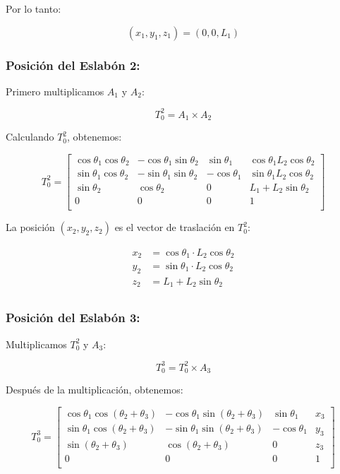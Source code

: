 \documentclass[10pt]{article}
\theoremstyle{definition}
\theoremstyle{remark}
\theoremstyle{definition}
\numberwithin{equation}{prob}
\begin{document}
Por lo tanto:

\[
(x_1, y_1, z_1) = (0, 0, L_1)
\]

\subsubsection{Posición del Eslabón 2:}

Primero multiplicamos \( A_1 \) y \( A_2 \):

\[
T_0^2 = A_1 \times A_2
\]

Calculando \( T_0^2 \), obtenemos:

\[
T_0^2 = \begin{bmatrix}
\cos\theta_1 \cos\theta_2 & -\cos\theta_1 \sin\theta_2 & \sin\theta_1 & \cos\theta_1 L_2 \cos\theta_2 \\
\sin\theta_1 \cos\theta_2 & -\sin\theta_1 \sin\theta_2 & -\cos\theta_1 & \sin\theta_1 L_2 \cos\theta_2 \\
\sin\theta_2 & \cos\theta_2 & 0 & L_1 + L_2 \sin\theta_2 \\
0 & 0 & 0 & 1 \\
\end{bmatrix}
\]

La posición \( (x_2, y_2, z_2) \) es el vector de traslación en \( T_0^2 \):


\[
\begin{aligned}
x_2 &= \cos\theta_1 \cdot L_2 \cos\theta_2 \\
y_2 &= \sin\theta_1 \cdot L_2 \cos\theta_2 \\
z_2 &= L_1 + L_2 \sin\theta_2 \\
\end{aligned}
\]


\subsubsection{Posición del Eslabón 3:}

Multiplicamos \( T_0^2 \) y \( A_3 \):

\[
T_0^3 = T_0^2 \times A_3
\]

Después de la multiplicación, obtenemos:

\[
T_0^3 = \begin{bmatrix}
\cos\theta_1 \cos(\theta_2 + \theta_3) & -\cos\theta_1 \sin(\theta_2 + \theta_3) & \sin\theta_1 & x_3 \\
\sin\theta_1 \cos(\theta_2 + \theta_3) & -\sin\theta_1 \sin(\theta_2 + \theta_3) & -\cos\theta_1 & y_3 \\
\sin(\theta_2 + \theta_3) & \cos(\theta_2 + \theta_3) & 0 & z_3 \\
0 & 0 & 0 & 1 \\
\end{bmatrix}
\]
\end{document}
